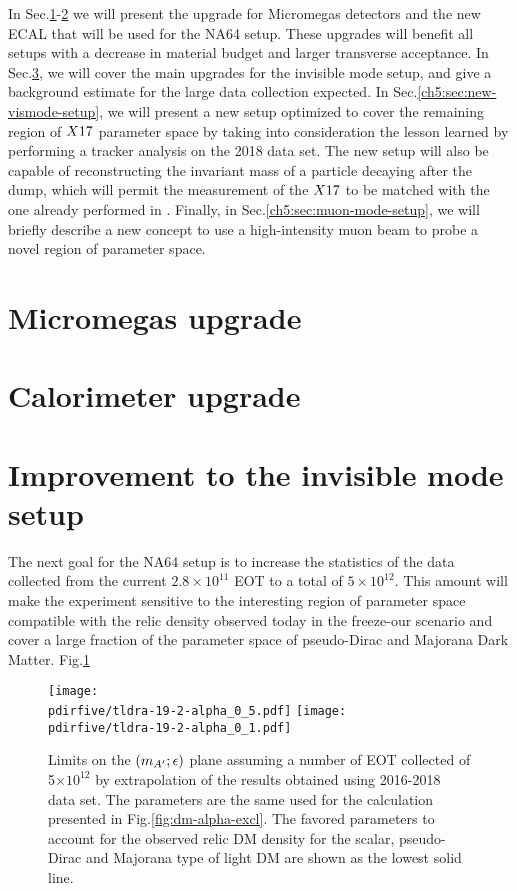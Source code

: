 In Sec.\ref{ch5:sec:mm-upgrades}-\ref{ch5:sec:cal-upgrades} we will present the upgrade for Micromegas detectors and the new ECAL that will be used for the NA64 setup. These upgrades will benefit all setups with a decrease in material budget and larger transverse acceptance. In Sec.\ref{ch5:sec:new-invismode-setup}, we will cover the main upgrades for the invisible mode setup, and give a background estimate for the large data collection expected. In Sec.\ref{ch5:sec:new-vismode-setup}, we will present a new setup optimized to cover the remaining region of $X17$ parameter space by taking into consideration the lesson learned by performing a tracker analysis on the 2018 data set. The new setup will also be capable of reconstructing the invariant mass of a particle decaying after the dump, which will permit the measurement of the $X17$ to be matched with the one already performed in \cite{Krasznahorkay:2015iga,Krasznahorkay:2019lyl}. Finally, in Sec.\ref{ch5:sec:muon-mode-setup}, we will briefly describe a new concept to use a high-intensity muon beam to probe a novel region of parameter space.

\section{Micromegas upgrade}
\label{ch5:sec:mm-upgrades}

\section{Calorimeter upgrade}
\label{ch5:sec:cal-upgrades}

\section{Improvement to the invisible mode setup}
\label{ch5:sec:new-invismode-setup}

The next goal for the NA64 setup is to increase the statistics of the data collected from the current $2.8 \times 10^{11}$ EOT to a total of $5 \times 10^{12}$. This amount will make the experiment sensitive to the interesting region of parameter space compatible with the relic density observed today in the freeze-our scenario and cover a large fraction of the parameter space of pseudo-Dirac and Majorana Dark Matter. Fig.\ref{fig:dm-sens-proj}

\begin{figure}[bht!]
  \centering
  \texttt{[image: \\pdirfive/tldra-19-2-alpha\_0\_5.pdf]}
  \texttt{[image: \\pdirfive/tldra-19-2-alpha\_0\_1.pdf]}
  \caption[sensitivity projection for invisible mode 2021]{Limits on the $(m_{A'};\epsilon)$ plane assuming a number of EOT collected of 5$\times 10^{12}$ by extrapolation of the results obtained using 2016-2018 data set. The parameters are the same used for the calculation presented in Fig.\ref{fig:dm-alpha-excl}. The favored parameters to account for the observed relic DM density for the scalar, pseudo-Dirac and Majorana type of light DM are shown as the lowest solid line.}
  \label{fig:dm-sens-proj}
\end{figure}

